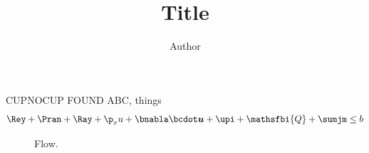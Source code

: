 \documentclass{jfm}
\begin{document}
\title{Title}
\author{Author}
\ifCUPmtlplainloaded CUP\else NOCUP\fi
{}\iffontfound FOUND\fi
\captionsetup[figure]{justification=justified}
A\ls B\ns C, \eg{} things \etc
\begin{equation}
\Rey + \Pran + \Ray + \p_x u + \bnabla\bcdot\boldsymbol{u} + \upi + \mathsfbi{Q} + \sumjm \le b
\end{equation}
\begin{figure}\caption{Flow.}\end{figure}
\end{document}
